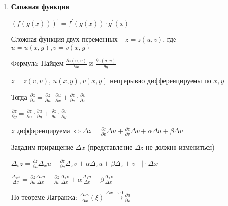 \documentclass[12pt]{article}
\begin{document}
    \begin{enumerate}[label*=\textbf{\arabic**} ]
        \item \textbf{Сложная функция}

        \Mem $\displaystyle (f(g(x)))^\prime = f^\prime(g(x)) \cdot g^\prime(x)$

        \Def Сложная функция двух переменных -- $\displaystyle z = z(u, v)$, где $u = u(x, y), v = v(x, y)$

        Формула: Найдем $\displaystyle \frac{\partial z(u, v)}{\partial x}$ и $\displaystyle \frac{\partial z(u, v)}{\partial y}$

        \begin{MyTheorem}
            \Ths $\displaystyle z = z(u, v), \ u(x, y), v(x, y)$ непрерывно дифференцируемы по $\displaystyle x, y$

            Тогда $\displaystyle \frac{\partial z}{\partial x} = \frac{\partial z}{\partial u} \cdot \frac{\partial u}{\partial x} + \frac{\partial z}{\partial v} \cdot \frac{\partial v}{\partial x}$

            $\displaystyle \frac{\partial z}{\partial y} = \frac{\partial z}{\partial u} \cdot \frac{\partial u}{\partial y} + \frac{\partial z}{\partial v} \cdot \frac{\partial v}{\partial y}$
        \end{MyTheorem}

        \begin{MyProof}
            $\displaystyle z$ дифференцируема $\displaystyle \Longleftrightarrow \Delta z = \frac{\partial z}{\partial u} \Delta u + \frac{\partial z}{\partial v} \Delta v + \alpha \Delta u + \beta \Delta v$

            Зададим приращение $\displaystyle \Delta x$ (представление $\displaystyle \Delta z$ не должно измениться)

            $\displaystyle \Delta_x z = \frac{\partial z}{\partial u} \Delta_x u + \frac{\partial z}{\partial v} \Delta_x v + \alpha \Delta_x u + \beta \Delta_x + v \quad \Big| \cdot \Delta x$

            $\displaystyle \frac{\Delta_x z}{\Delta x} = \frac{\partial z}{\partial u} \frac{\Delta_x u}{\Delta x} + \frac{\partial z}{\partial v} \frac{\Delta_x v}{\Delta x} + \alpha \frac{\Delta_x u}{\Delta x} + \beta \frac{\Delta_x v}{\Delta x}$

            По теореме Лагранжа: $\displaystyle \frac{\Delta_x u}{\Delta x}(\xi) \stackrel{\Delta x \to 0}{\rightarrow} \frac{\partial u}{\partial x}$


\end{MyProof}
\end{enumerate}
\end{document}
